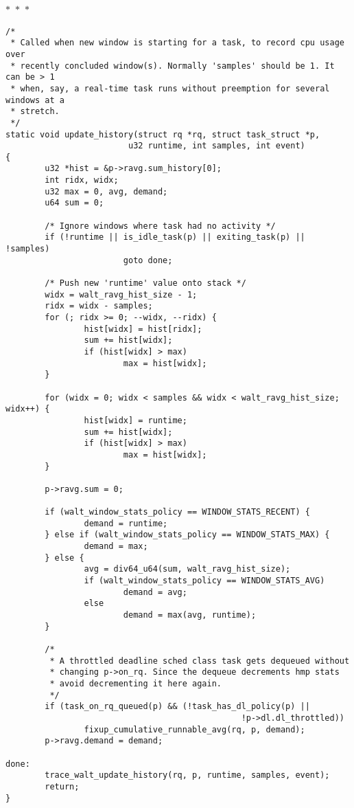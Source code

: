 \documentclass{article}
\newcommand{\divider}{{\begin{center}
  $\ast$~$\ast$~$\ast$
\end{center}}}
\begin{document}
\divider
\begin{verbatim}
/*
 * Called when new window is starting for a task, to record cpu usage over
 * recently concluded window(s). Normally 'samples' should be 1. It can be > 1
 * when, say, a real-time task runs without preemption for several windows at a
 * stretch.
 */
static void update_history(struct rq *rq, struct task_struct *p,
                         u32 runtime, int samples, int event)
{
        u32 *hist = &p->ravg.sum_history[0];
        int ridx, widx;
        u32 max = 0, avg, demand;
        u64 sum = 0;

        /* Ignore windows where task had no activity */
        if (!runtime || is_idle_task(p) || exiting_task(p) || !samples)
                        goto done;

        /* Push new 'runtime' value onto stack */
        widx = walt_ravg_hist_size - 1;
        ridx = widx - samples;
        for (; ridx >= 0; --widx, --ridx) {
                hist[widx] = hist[ridx];
                sum += hist[widx];
                if (hist[widx] > max)
                        max = hist[widx];
        }

        for (widx = 0; widx < samples && widx < walt_ravg_hist_size; widx++) {
                hist[widx] = runtime;
                sum += hist[widx];
                if (hist[widx] > max)
                        max = hist[widx];
        }

        p->ravg.sum = 0;

        if (walt_window_stats_policy == WINDOW_STATS_RECENT) {
                demand = runtime;
        } else if (walt_window_stats_policy == WINDOW_STATS_MAX) {
                demand = max;
        } else {
                avg = div64_u64(sum, walt_ravg_hist_size);
                if (walt_window_stats_policy == WINDOW_STATS_AVG)
                        demand = avg;
                else
                        demand = max(avg, runtime);
        }

        /*
         * A throttled deadline sched class task gets dequeued without
         * changing p->on_rq. Since the dequeue decrements hmp stats
         * avoid decrementing it here again.
         */
        if (task_on_rq_queued(p) && (!task_has_dl_policy(p) ||
                                                !p->dl.dl_throttled))
                fixup_cumulative_runnable_avg(rq, p, demand);
        p->ravg.demand = demand;

done:
        trace_walt_update_history(rq, p, runtime, samples, event);
        return;
}
\end{verbatim}
\end{document}
